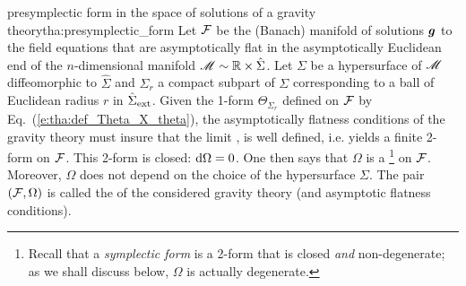 \begin{tprop}{presymplectic form in the space of solutions of a gravity theory}{tha:presymplectic_form}
Let $\mathcal{F}$ be the (Banach) manifold of solutions $\bm{g}$ to the field equations
that are asymptotically flat in the asymptotically Euclidean end of the
$n$-dimensional manifold $\mathscr{M} \sim \mathbb{R} \times \hat{\Sigma}$. Let
$\Sigma$ be a hypersurface of $\mathscr{M}$ diffeomorphic to $\hat{\Sigma}$
and $\Sigma_r$ a compact subpart
of $\Sigma$ corresponding to a ball of Euclidean radius $r$
in $\hat{\Sigma}_{\rm ext}$.
Given the 1-form $\Theta_{\Sigma_r}$ defined on $\mathcal{F}$ by Eq.~(\ref{e:tha:def_Theta_X_theta}),
the asymptotically flatness conditions of the gravity theory must insure that the limit
\be \label{e:tha:def_Omega_gravity}
   ,
\ee
is well defined, i.e. yields a finite 2-form on $\mathcal{F}$. This 2-form is closed:
$\mathrm{d}\Omega = 0$. One then says that $\Omega$ is a
\footnote{Recall that a \emph{symplectic form} is a 2-form that is closed \emph{and} non-degenerate; as we shall discuss
below, $\Omega$ is actually degenerate.} on $\mathcal{F}$.
Moreover, $\Omega$ does not depend on the choice of the hypersurface $\Sigma$.
The pair $(\mathcal{F},\Omega)$ is called the  of the considered gravity theory
(and asymptotic flatness conditions).
\end{tprop}

